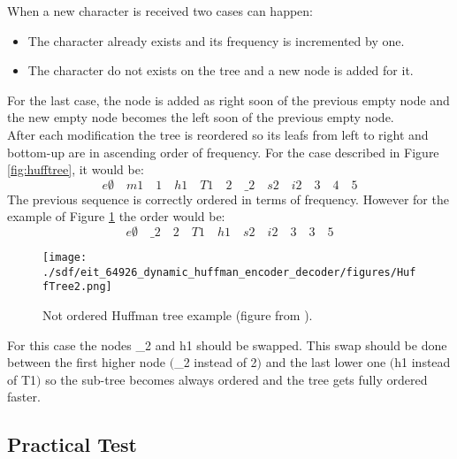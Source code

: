 \begin{refsection}
When a new character is received two cases can happen:
\begin{itemize}
\item The character already exists and its frequency is incremented by one.
\item The character do not exists on the tree and a new node is added for it.
\end{itemize}

For the last case, the node is added as right soon of the previous empty node and the new empty node becomes the left soon of the previous empty node.\\
After each modification the tree is reordered so its leafs from left to right and bottom-up are in ascending order of frequency. For the case described in Figure \ref{fig:hufftree}, it would be:
\[ e\emptyset \quad m1 \quad 1 \quad h1 \quad T1 \quad 2 \quad \_2 \quad s2 \quad i2 \quad 3 \quad 4 \quad 5 \]
\hspace{5mm} The previous sequence is correctly ordered in terms of frequency. However for the example of Figure \ref{fig:hufftree2} the order would be:
\[ e\emptyset \quad \_2 \quad 2 \quad T1 \quad h1 \quad s2 \quad i2 \quad 3 \quad 3 \quad 5 \]

\begin{figure}[H]
	\centering
	\texttt{[image: ./sdf/eit\_64926\_dynamic\_huffman\_encoder\_decoder/figures/HuffTree2.png]}
	\caption{Not ordered Huffman tree example (figure from \cite{DigComm}).}\label{fig:hufftree2}
\end{figure}


For this case the nodes \_2 and h1 should be swapped. This swap should be done between the first higher node $($\_2 instead of 2$)$ and the last lower one $($h1 instead of T1$)$ so the sub-tree becomes always ordered and the tree gets fully ordered faster.

\subsection{Practical Test}


\end{refsection}
